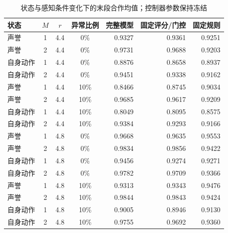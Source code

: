 \begin{table}[!htbp]
\centering\small
\caption{状态与感知条件变化下的末段合作均值；控制器参数保持冻结}
\label{tab:w2-state-generalization}
\begin{tabular}{lcccrrr}
\toprule
状态 & $M$ & $r$ & 异常比例 & 完整模型 & 固定评分/门控 & 固定规则 \\
\midrule
声誉 & 1 & 4.4 & 0\% & 0.9327 & 0.9361 & 0.9251 \\
声誉 & 2 & 4.4 & 0\% & 0.9731 & 0.9688 & 0.9203 \\
自身动作 & 1 & 4.4 & 0\% & 0.8876 & 0.8658 & 0.8937 \\
自身动作 & 2 & 4.4 & 0\% & 0.9451 & 0.9338 & 0.9162 \\
声誉 & 1 & 4.4 & 10\% & 0.8466 & 0.8745 & 0.9034 \\
声誉 & 2 & 4.4 & 10\% & 0.9685 & 0.9617 & 0.9209 \\
自身动作 & 1 & 4.4 & 10\% & 0.8049 & 0.8095 & 0.8575 \\
自身动作 & 2 & 4.4 & 10\% & 0.9384 & 0.9293 & 0.9166 \\
声誉 & 1 & 4.8 & 0\% & 0.9668 & 0.9635 & 0.9553 \\
声誉 & 2 & 4.8 & 0\% & 0.9834 & 0.9856 & 0.9422 \\
自身动作 & 1 & 4.8 & 0\% & 0.9456 & 0.9274 & 0.9271 \\
自身动作 & 2 & 4.8 & 0\% & 0.9782 & 0.9709 & 0.9366 \\
声誉 & 1 & 4.8 & 10\% & 0.9313 & 0.9343 & 0.9476 \\
声誉 & 2 & 4.8 & 10\% & 0.9844 & 0.9843 & 0.9424 \\
自身动作 & 1 & 4.8 & 10\% & 0.9005 & 0.8946 & 0.9130 \\
自身动作 & 2 & 4.8 & 10\% & 0.9755 & 0.9692 & 0.9360 \\
\bottomrule
\end{tabular}
\par{}
\end{table}
